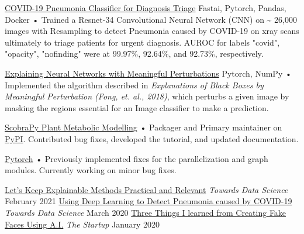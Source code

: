 \documentclass[]{awesome-cv}
\begin{document}
\vspace{-10mm}
\begin{cventries}
	\cventry
	{}
	{\href{https://github.com/ajsanjoaquin/COVID-19-Scanner}{COVID-19 Pneumonia Classifier for Diagnosis Triage}}
	{Fastai, Pytorch, Pandas, Docker}
	{}
	{• Trained a Resnet-34 Convolutional Neural Network (CNN) on \textasciitilde{} 26,000 images with Resampling to detect Pneumonia caused by COVID-19 on xray scans ultimately to triage patients for urgent diagnosis. AUROC for labels "covid", "opacity", "nofinding" were at 99.97\%, 92.64\%, and 92.73\%, respectively.}

	\vspace{-1mm}
	\cventry
	{}
	{\href{https://github.com/ajsanjoaquin/mPerturb}{Explaining Neural Networks with Meaningful Perturbations}}
	{Pytorch, NumPy}
	{}
	{• Implemented the algorithm described in \textit{Explanations of Black Boxes by Meaningful Perturbation (Fong, et. al., 2018)}, which perturbs a given image by masking the regions essential for an Image classifier to make a prediction.}
	
	\vspace{-1mm}
	\cventry
	{}
	{\href{https://github.com/mauriceccy/scobra/commits?author=ajsanjoaquin}{ScobraPy Plant Metabolic Modelling}}
	{}
	{}
	{• Packager and Primary maintainer on \href{https://pypi.org/project/scobra/}{PyPI}. Contributed bug fixes, developed the tutorial, and updated documentation.}

	\vspace{-2mm}
	\cventry
	{}
	{\href{https://github.com/pytorch/pytorch/commits?author=ajsanjoaquin}{Pytorch}}
	{}
	{}
	{• Previously implemented fixes for the parallelization and graph modules. Currently working on minor bug fixes.}
	
	\vspace{-4mm}
\end{cventries}
\begin{cvhonors}
	\cvhonor
	{\href{https://towardsdatascience.com/lets-keep-explainable-methods-practical-and-relevant-92e963ce3f64}{Let’s Keep Explainable Methods Practical and Relevant}}
	{\textit{Towards Data Science}}
	{}
	{February 2021}
	\cvhonor
	{\href{https://towardsdatascience.com/using-deep-learning-to-detect-ncov-19-from-x-ray-images-1a89701d1acd}{Using Deep Learning to Detect Pneumonia caused by COVID-19}}
	{\textit{Towards Data Science}}
	{}
	{March 2020}
	\cvhonor
	{\href{https://medium.com/swlh/three-things-i-learned-from-creating-fake-faces-using-ai-fc4c95282a37}{Three Things I learned from Creating Fake Faces Using A.I.}}
	{\textit{The Startup}}
	{}
	{January 2020}
\end{cvhonors}
\vspace{-20mm}
\ 
\end{document}
